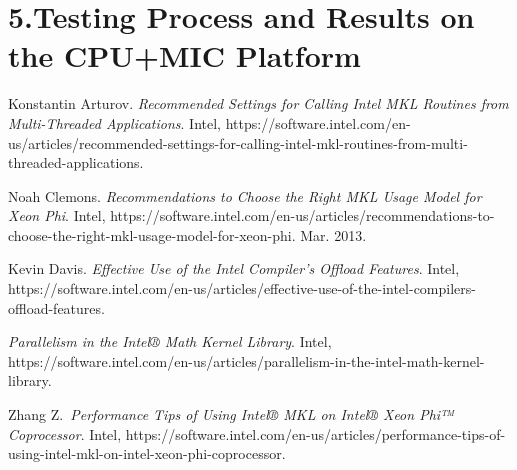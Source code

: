 \documentclass{article}
\begin{document}
\section{5.\hspace*{0.5em}Testing Process and Results on the CPU+MIC Platform}\label{sec-testing-process-and-results-on-the-cpumic-platform}%

{%
\begin{thebibliography}{5}%
\label{sec-bibliography}%

Konstantin Arturov. \emph{Recommended Settings for Calling Intel MKL Routines from Multi-Threaded Applications}. Intel, https://software.intel.com/en-us/articles/recommended-settings-for-calling-intel-mkl-routines-from-multi-threaded-applications.\label{mkl_threads}%

Noah Clemons. \emph{Recommendations to Choose the Right MKL Usage Model for Xeon Phi}. Intel, https://software.intel.com/en-us/articles/recommendations-to-choose-the-right-mkl-usage-model-for-xeon-phi. Mar. 2013.\label{mkl-mic}%

Kevin Davis. \emph{Effective Use of the Intel Compiler’s Offload Features}. Intel, https://software.intel.com/en-us/articles/effective-use-of-the-intel-compilers-offload-features.\label{effective_use}%

\emph{Parallelism in the Intel® Math Kernel Library}. Intel, https://software.intel.com/en-us/articles/parallelism-in-the-intel-math-kernel-library.\label{paramkl}%

Zhang Z.~\emph{Performance Tips of Using Intel® MKL on Intel® Xeon Phi™ Coprocessor}. Intel, https://software.intel.com/en-us/articles/performance-tips-of-using-intel-mkl-on-intel-xeon-phi-coprocessor.\label{page_file}%
\par%
\end{thebibliography}}%
\end{document}
